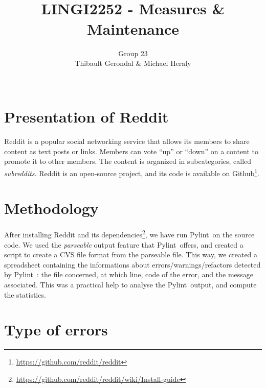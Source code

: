 \documentclass[11pt, a4paper]{article}
\title{\tbf{UCL} \\
	LINGI2252 - Measures \& Maintenance}
\author{Group 23 \\
		Thibault Gerondal \& Michael Heraly \\
		\\
		\tit{Teacher: Kim Mens}}
\newcommand{\tit}[1]{\textit{#1}}
\newcommand{\pyl}{\textsf{Pylint}\ }
\begin{document}
\maketitle


\section*{Presentation of Reddit}

Reddit is a popular social networking service that allows its members to share content as text posts or links.
Members can vote ``up'' or ``down'' on a content to promote it to other members.
The content is organized in subcategories, called \tit{subreddits}.
Reddit is an open-source project, and its code is available on Github\footnote{\url{https://github.com/reddit/reddit}}.


\section{Methodology}

After installing Reddit and its dependencies\footnote{\url{https://github.com/reddit/reddit/wiki/Install-guide}}, we have run \pyl on the source code.
We used the \tit{parseable} output feature that \pyl offers, and created a script to create a CVS file format from the parseable file.
This way, we created a spreadsheet containing the informations about errors/warnings/refactors detected by \pyl: the file concerned, at which line, code of the error, and the message associated.
This was a practical help to analyse the \pyl output, and compute the statistics.

\newpage
\section{Type of errors}
\end{document}

